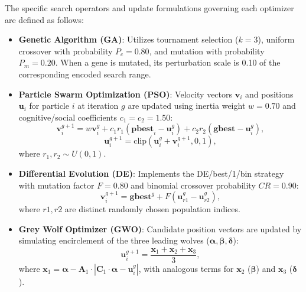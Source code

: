 The specific search operators and update formulations governing each optimizer are defined as follows:
\begin{itemize}
    \item \textbf{Genetic Algorithm (GA)}: Utilizes tournament selection ($k=3$), uniform crossover with probability $P_c = 0.80$, and mutation with probability $P_m = 0.20$. When a gene is mutated, its perturbation scale is 0.10 of the corresponding encoded search range.
    \item \textbf{Particle Swarm Optimization (PSO)}: Velocity vectors $\mathbf{v}_i$ and positions $\mathbf{u}_i$ for particle $i$ at iteration $g$ are updated using inertia weight $w = 0.70$ and cognitive/social coefficients $c_1 = c_2 = 1.50$:
    \begin{equation}\label{eq:pso_update}
    \mathbf{v}_i^{g+1} = w \mathbf{v}_i^g + c_1 r_1 (\mathbf{pbest}_i - \mathbf{u}_i^g) + c_2 r_2 (\mathbf{gbest} - \mathbf{u}_i^g),
    \end{equation}
    \begin{equation}
    \mathbf{u}_i^{g+1} = \mathrm{clip}\left(\mathbf{u}_i^g + \mathbf{v}_i^{g+1}, 0, 1\right),
    \end{equation}
    where $r_1, r_2 \sim U(0, 1)$.
    \item \textbf{Differential Evolution (DE)}: Implements the DE/best/1/bin strategy with mutation factor $F = 0.80$ and binomial crossover probability $CR = 0.90$:
    \begin{equation}\label{eq:de_update}
    \mathbf{v}_i^{g+1} = \mathbf{gbest}^g + F (\mathbf{u}_{r1}^g - \mathbf{u}_{r2}^g),
    \end{equation}
    where $r1, r2$ are distinct randomly chosen population indices.
    \item \textbf{Grey Wolf Optimizer (GWO)}: Candidate position vectors are updated by simulating encirclement of the three leading wolves ($\bm{\alpha}, \bm{\beta}, \bm{\delta}$):
    \begin{equation}\label{eq:gwo_update}
    \mathbf{u}_i^{g+1} = \frac{\mathbf{x}_1 + \mathbf{x}_2 + \mathbf{x}_3}{3},
    \end{equation}
    where $\mathbf{x}_1 = \bm{\alpha} - \mathbf{A}_1 \cdot |\mathbf{C}_1 \cdot \bm{\alpha} - \mathbf{u}_i^g|$, with analogous terms for $\mathbf{x}_2$ ($\bm{\beta}$) and $\mathbf{x}_3$ ($\bm{\delta}$).
\end{itemize}

